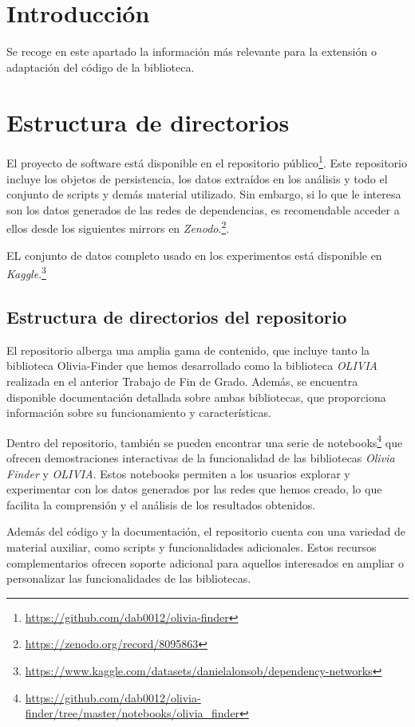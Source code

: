 
\section{Introducción}
Se recoge en este apartado la información más relevante para la extensión
o adaptación del código de la biblioteca.

\section{Estructura de directorios}
El proyecto de software está disponible en el repositorio público\footnote{\url{https://github.com/dab0012/olivia-finder}}.
Este repositorio incluye los objetos de persistencia, los datos extraídos en los análisis y todo el
conjunto de scripts y demás material utilizado. Sin embargo, si lo que le interesa son los datos generados de las redes de dependencias,
es recomendable acceder a ellos desde los siguientes mirrors en \textit{Zenodo}.\footnote{\url{https://zenodo.org/record/8095863}}.

EL conjunto de datos completo usado en los experimentos está disponible en \textit{Kaggle}.\footnote{\url{https://www.kaggle.com/datasets/danielalonsob/dependency-networks}}

\subsection{Estructura de directorios del repositorio}

El repositorio alberga una amplia gama de contenido, que incluye tanto la biblioteca Olivia-Finder que hemos
desarrollado como la biblioteca \textit{OLIVIA} realizada en el anterior Trabajo de Fin de Grado\cite{Seto-Rey20231}. Además, se encuentra
disponible documentación detallada sobre ambas bibliotecas, que proporciona información sobre su
funcionamiento y características.

Dentro del repositorio, también se pueden encontrar una serie de notebooks\footnote{\url{https://github.com/dab0012/olivia-finder/tree/master/notebooks/olivia\_finder}} 
que ofrecen demostraciones interactivas de la funcionalidad de las bibliotecas \textit{Olivia Finder} y \textit{OLIVIA}. 
Estos notebooks permiten a los usuarios explorar y experimentar con los datos generados por las redes que 
hemos creado, lo que facilita la comprensión y el análisis de los resultados obtenidos.

Además del código y la documentación, el repositorio cuenta con una variedad de material auxiliar, como scripts
y funcionalidades adicionales. Estos recursos complementarios ofrecen soporte adicional para aquellos interesados
en ampliar o personalizar las funcionalidades de las bibliotecas.

